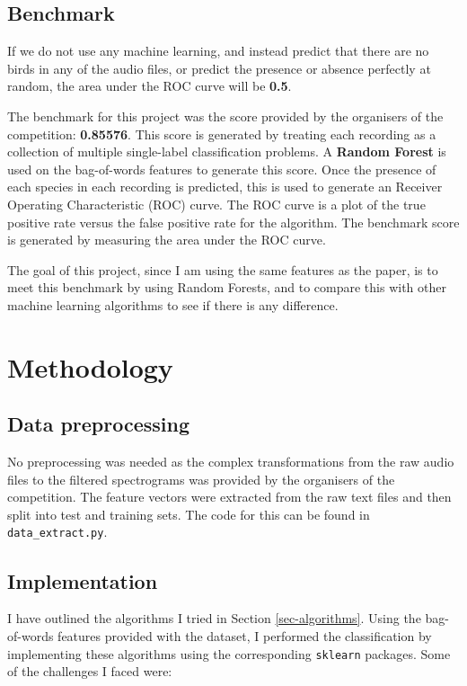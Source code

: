 \documentclass[11pt]{article}
\begin{document}
\subsection{Benchmark}

If we do not use any machine learning, and instead predict that there are no birds in any of the audio files, or predict the presence or absence perfectly at random, the area under the ROC curve will be \textbf{0.5}.

The benchmark for this project was the score provided by the organisers of the competition: \textbf{0.85576}. This score is generated by treating each recording as a collection of multiple single-label classification problems. A \textbf{Random Forest} is used on the bag-of-words features to generate this score. Once the presence of each species in each recording is predicted, this is used to generate an Receiver Operating Characteristic (ROC) curve. The ROC curve is a plot of the true positive rate versus the false positive rate for the algorithm. The benchmark score is generated by measuring the area under the ROC curve. 

The goal of this project, since I am using the same features as the paper, is to meet this benchmark by using Random Forests, and to compare this with other machine learning algorithms to see if there is any difference. 

\section{Methodology}

\subsection{Data preprocessing}

No preprocessing was needed as the complex transformations from the raw audio files to the filtered spectrograms was provided by the organisers of the competition. The feature vectors were extracted from the raw text files and then split into test and training sets. The code for this can be found in \texttt{data\_extract.py}.

\subsection{Implementation}
\label{sec-implementation}

I have outlined the algorithms I tried in Section \ref{sec-algorithms}. Using the bag-of-words features provided with the dataset, I performed the classification by implementing these algorithms using the corresponding \texttt{sklearn} packages. Some of the challenges I faced were:
\end{document}
